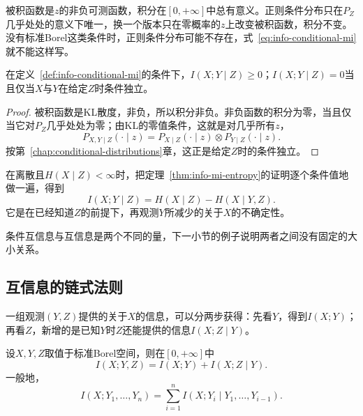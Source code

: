 被积函数是$z$的非负可测函数，积分在$[0,+\infty]$中总有意义。正则条件分布只在$P_Z$几乎处处的意义下唯一，换一个版本只在零概率的$z$上改变被积函数，积分不变。没有标准Borel这类条件时，正则条件分布可能不存在，式~\eqref{eq:info-conditional-mi}就不能这样写。

\begin{theorem}[条件互信息与条件独立]
\label{thm:info-conditional-mi-zero}
在定义~\ref{def:info-conditional-mi}的条件下，$I(X;Y\mid Z)\geq0$；$I(X;Y\mid Z)=0$当且仅当$X$与$Y$在给定$Z$时条件独立。
\end{theorem}

\begin{proof}
被积函数是KL散度，非负，所以积分非负。非负函数的积分为零，当且仅当它对$P_Z$几乎处处为零；由KL的零值条件，这就是对几乎所有$z$，
\[
  P_{X,Y\mid Z}(\cdot\mid z)=P_{X\mid Z}(\cdot\mid z)\otimes P_{Y\mid Z}(\cdot\mid z).
\]按第~\ref{chap:conditional-distributions}章，这正是给定$Z$时的条件独立。
\end{proof}

在离散且$H(X\mid Z)<\infty$时，把定理~\ref{thm:info-mi-entropy}的证明逐个条件值地做一遍，得到
\begin{equation}
  I(X;Y\mid Z)=H(X\mid Z)-H(X\mid Y,Z).
  \label{eq:info-conditional-mi-entropy}
\end{equation}
它是在已经知道$Z$的前提下，再观测$Y$所减少的关于$X$的不确定性。

条件互信息与互信息是两个不同的量，下一小节的例子说明两者之间没有固定的大小关系。

\subsection{互信息的链式法则}
\label{sec:info-mi-chain-rule}

一组观测$(Y,Z)$提供的关于$X$的信息，可以分两步获得：先看$Y$，得到$I(X;Y)$；再看$Z$，新增的是已知$Y$时$Z$还能提供的信息$I(X;Z\mid Y)$。

\begin{theorem}[互信息的链式法则]
\label{thm:info-mi-chain-rule}
设$X,Y,Z$取值于标准Borel空间，则在$[0,+\infty]$中
\begin{equation}
  I(X;Y,Z)=I(X;Y)+I(X;Z\mid Y).
  \label{eq:info-mi-chain-rule}
\end{equation}
一般地，
\begin{equation}
  I(X;Y_1,\dots,Y_n)=\sum_{i=1}^{n}I(X;Y_i\mid Y_1,\dots,Y_{i-1}).
  \label{eq:info-mi-chain-rule-n}
\end{equation}
\end{theorem}

